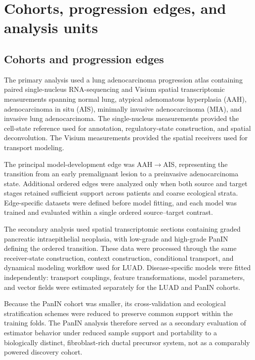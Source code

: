 \section{Cohorts, progression edges, and analysis units}
\label{sec:methods-cohorts}

\subsection{Cohorts and progression edges}
\label{sec:methods-luad-cohort}
\label{sec:methods-panin-cohort}

The primary analysis used a lung adenocarcinoma progression atlas containing
paired single-nucleus RNA-sequencing and Visium spatial transcriptomic
measurements spanning normal lung, atypical adenomatous hyperplasia (AAH),
adenocarcinoma in situ (AIS), minimally invasive adenocarcinoma (MIA), and invasive lung adenocarcinoma. The single-nucleus measurements provided the cell-state reference used for annotation, regulatory-state construction, and spatial deconvolution. The Visium measurements provided the spatial receivers used for transport modeling.

The principal model-development edge was AAH\(\rightarrow\)AIS, representing the transition from an early premalignant lesion to a preinvasive adenocarcinoma state. Additional ordered edges were analyzed only when both source and target stages retained sufficient support across patients and coarse ecological strata. Edge-specific datasets were defined before model fitting, and each model was trained and evaluated within a single ordered source--target contrast.

The secondary analysis used spatial transcriptomic sections containing graded pancreatic intraepithelial neoplasia, with low-grade and high-grade PanIN defining the ordered transition. These data were processed through the same receiver-state construction, context construction, conditional transport, and dynamical modeling workflow used for LUAD. Disease-specific models were fitted independently: transport couplings, feature transformations, model parameters, and vector fields were estimated separately for the LUAD and PanIN cohorts.

Because the PanIN cohort was smaller, its cross-validation and ecological stratification schemes were reduced to preserve common support within the training folds. The PanIN analysis therefore served as a secondary evaluation of estimator behavior under reduced sample support and portability to a biologically distinct, fibroblast-rich ductal precursor system, not as a comparably powered discovery cohort.

